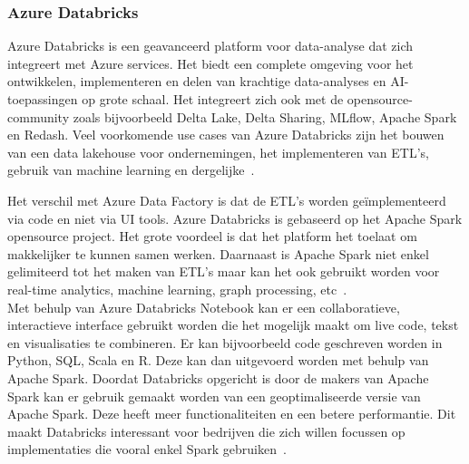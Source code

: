 %
%
%
%
%
%

\subsubsection{Azure Databricks}

Azure Databricks is een geavanceerd platform voor data-analyse dat zich integreert met Azure services. Het biedt een complete omgeving voor het ontwikkelen, implementeren en delen van krachtige data-analyses en AI-toepassingen op grote schaal. Het integreert zich ook met de opensource-community zoals bijvoorbeeld Delta Lake, Delta Sharing, MLflow, Apache Spark en Redash. Veel voorkomende use cases van Azure Databricks zijn het bouwen van een data lakehouse voor ondernemingen, het implementeren van ETL's, gebruik van machine learning en dergelijke~\autocite{Microsoft2024}.

Het verschil met Azure Data Factory is dat de ETL’s worden geïmplementeerd via code en niet via UI tools. Azure Databricks is gebaseerd op het Apache Spark opensource project. Het grote voordeel is dat het platform het toelaat om makkelijker te kunnen samen werken. Daarnaast is Apache Spark niet enkel gelimiteerd tot het maken van ETL’s maar kan het ook gebruikt worden voor real-time analytics, machine learning, graph processing, etc~\autocite{Etaati2019}.\\


Met behulp van Azure Databricks Notebook kan er een collaboratieve, interactieve interface gebruikt worden die het mogelijk maakt om live code, tekst en visualisaties te combineren. Er kan bijvoorbeeld code geschreven worden in Python, SQL, Scala en R. Deze kan dan uitgevoerd worden met behulp van Apache Spark. Doordat Databricks opgericht is door de makers van Apache Spark kan er gebruik gemaakt worden van een geoptimaliseerde versie van Apache Spark. Deze heeft meer functionaliteiten en een betere performantie. Dit maakt Databricks interessant voor bedrijven die zich willen focussen op implementaties die vooral enkel Spark gebruiken~\autocite{Hill2023}.\\

